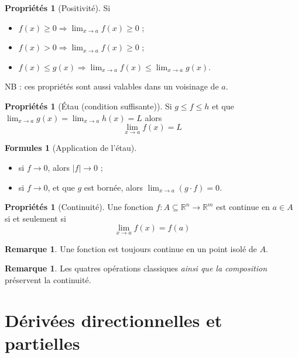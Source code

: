 \documentclass[11pt,a4paper]{article}
\theoremstyle{definition}
\newtheorem{myprop}[mydef]{Propriétés}
\newtheorem{myrem}[mydef]{Remarque}
\newtheorem{myform}[mydef]{Formules}
\newcommand{\R}{\mathbb{R}}
\newcommand{\fl}{\rightarrow}
\newcommand*\InsertTheoremBreak{%
  \begingroup %
    \setlength\itemsep{0pt}%
    \setlength\parsep{0pt}%
    \item[\vbox{\null}]%
  \endgroup%
 }%
\begin{document}
\begin{myprop}[Positivité] Si
\begin{itemize}
\item $f(x) \geq 0 \Rightarrow \lim_{x \fl a} f(x) \geq 0$ ;
\item $f(x) > 0 \Rightarrow \lim_{x \fl a} f(x) \geq 0$ ;
\item $f(x) \leq g(x) \Rightarrow \lim_{x \fl a} f(x) \leq \lim_{x \fl a} g(x)$.
\end{itemize}
NB : ces propriétés sont aussi valables dans un voisinage de $a$.
\end{myprop}

\begin{myprop}[Étau (condition suffisante)]
Si $g \leq f \leq h$ et que $\lim_{x \fl a} g(x) = \lim_{x \fl a} h(x) = L$ alors
\[ \lim_{x \fl a} f(x) = L \]
\end{myprop}

\begin{myform}[Application de l'étau]\InsertTheoremBreak
\begin{itemize}
\item si $f \rightarrow 0$, alors $|f| \rightarrow 0$ ;
\item si $f \fl 0$, et que $g$ est bornée, alors $\lim_{x \fl a} (g \cdot f) = 0$.
\end{itemize}
\end{myform}

\begin{myprop}[Continuité] Une fonction $f : A \subseteq \R^n \rightarrow \R^m$ est continue en $a \in A$ si et seulement si
\[ \lim_{x \rightarrow a}f(x) = f(a) \]
\end{myprop}

\begin{myrem} Une fonction est toujours continue en un point isolé de $A$. \end{myrem}
\begin{myrem} Les quatres opérations classiques \emph{ainsi que la composition} préservent la continuité. \end{myrem}


\section{Dérivées directionnelles et partielles}
\end{document}
